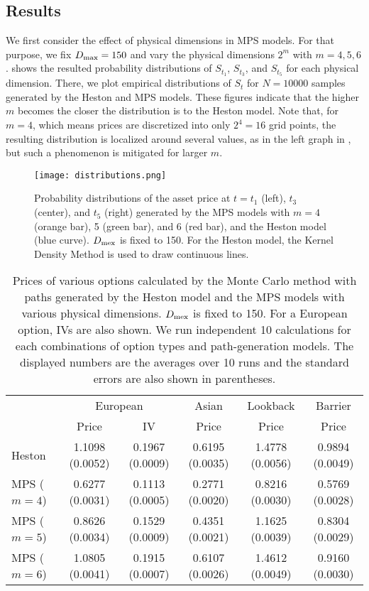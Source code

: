 {\subsection{Results}
We first consider the effect of physical dimensions in MPS models.
For that purpose, we fix $D_{\rm max} = 150$ and vary the physical dimensions $2^m$ with $m=4,5,6$.
 shows the resulted probability distributions of $S_{t_1}$, $S_{t_3}$, and $S_{t_5}$ for each physical dimension.
There, we plot empirical distributions of $S_t$ for $N=10000$ samples generated by the Heston and MPS models.
These figures indicate that the higher $m$ becomes the closer the distribution is to the Heston model.
Note that, for $m=4$, which means prices are discretized into only $2^4 = 16$ grid points, the resulting distribution is localized around several values, as in the left graph in , but such a phenomenon is mitigated for larger $m$.

\begin{figure}[H]
    \centering
    \texttt{[image: distributions.png]}
    \caption{Probability distributions of the asset price at $t=t_1$ (left), $t_3$ (center), and $t_5$ (right) generated by the MPS models with $m=4$ (orange bar), 5 (green bar), and 6 (red bar), and the Heston model (blue curve). $D_{\rm mex}$ is fixed to 150. For the Heston model, the Kernel Density Method \cite{silverman2018density} is used to draw continuous lines.}
    \label{fig:distributions}
\end{figure}

\begin{table}[h]
    \centering
    \small
    \begin{tabular}{l|ccccc}
             & \multicolumn{2}{c}{European} & Asian  & Lookback & Barrier  \\
             & Price & IV & Price & Price & Price \\
    \hline
    Heston   & 1.1098 (0.0052) & 0.1967  (0.0009) & 0.6195  (0.0035) & 1.4778  (0.0056)   & 0.9894  (0.0049)        \\
    MPS ($m=4$) & 0.6277 (0.0031) & 0.1113   (0.0005) & 0.2771  (0.0020) & 0.8216  (0.0030)  & 0.5769  (0.0028)     \\
    MPS ($m=5$) & 0.8626 (0.0034) & 0.1529   (0.0009) & 0.4351  (0.0021)& 1.1625   (0.0039) & 0.8304  (0.0029)      \\
    MPS ($m=6$) & 1.0805 (0.0041) & 0.1915  (0.0007) & 0.6107   (0.0026) & 1.4612   (0.0049) & 0.9160  (0.0030)      
    \end{tabular}
    \normalsize
    \caption{Prices of various options calculated by the Monte Carlo method with paths generated by the Heston model and the MPS models with various physical dimensions. $D_{\rm mex}$ is fixed to 150. For a European option, IVs are also shown. We run independent 10 calculations for each combinations of option types and path-generation models. The displayed numbers are the averages over 10 runs and the standard errors are also shown in parentheses.}
    \label{tab:result}
\end{table}

}

